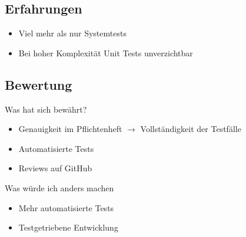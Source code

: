 \documentclass{beamer}
\begin{document}
  \subsection{Erfahrungen}
  \begin{frame}{\subsecname}
    \begin{itemize}
      \item Viel mehr als nur Systemtests
      \item Bei hoher Komplexität Unit Tests unverzichtbar
    \end{itemize}
  \end{frame}

  \subsection{Bewertung}
  \begin{frame}{\subsecname}
      \begin{block}{Was hat sich bewährt?}
        \begin{itemize}
          \item Genauigkeit im Pflichtenheft $\to$ Vollständigkeit der Testfälle
          \item Automatisierte Tests
          \item Reviews auf GitHub
        \end{itemize}
      \end{block}

      \begin{block}{Was würde ich anders machen}
        \begin{itemize}
          \item Mehr automatisierte Tests
          \item Testgetriebene Entwicklung
        \end{itemize}
      \end{block}
  \end{frame}
\end{document}
